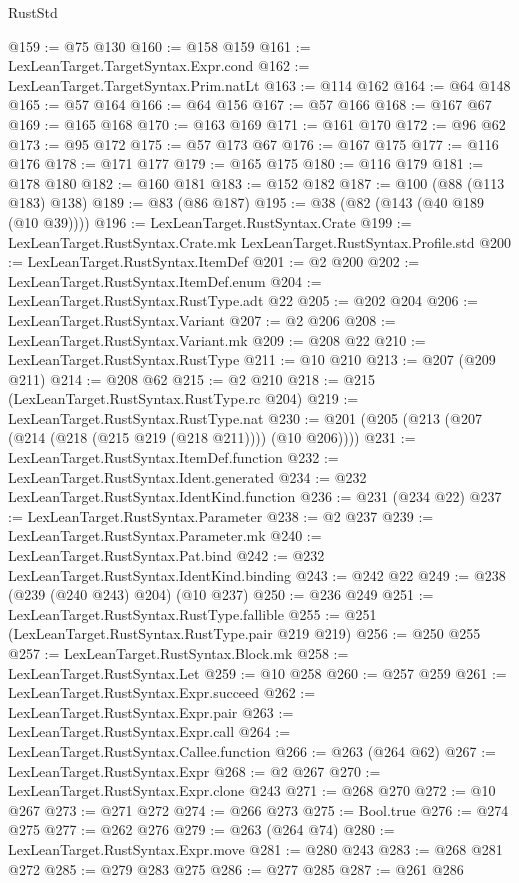 \begin{lexlean}{RustStd}
\begin{coremodule}
{\begin{coremodule}
{{{{{{{@159 := @75 @130
@160 := @158 @159
@161 := LexLeanTarget.TargetSyntax.Expr.cond
@162 := LexLeanTarget.TargetSyntax.Prim.natLt
@163 := @114 @162
@164 := @64 @148
@165 := @57 @164
@166 := @64 @156
@167 := @57 @166
@168 := @167 @67
@169 := @165 @168
@170 := @163 @169
@171 := @161 @170
@172 := @96 @62
@173 := @95 @172
@175 := @57 @173 @67
@176 := @167 @175
@177 := @116 @176
@178 := @171 @177
@179 := @165 @175
@180 := @116 @179
@181 := @178 @180
@182 := @160 @181
@183 := @152 @182
@187 := @100 (@88 (@113 @183) @138)
@189 := @83 (@86 @187)
@195 := @38 (@82 (@143 (@40 @189 (@10 @39))))
@196 := LexLeanTarget.RustSyntax.Crate
@199 := LexLeanTarget.RustSyntax.Crate.mk LexLeanTarget.RustSyntax.Profile.std
@200 := LexLeanTarget.RustSyntax.ItemDef
@201 := @2 @200
@202 := LexLeanTarget.RustSyntax.ItemDef.enum
@204 := LexLeanTarget.RustSyntax.RustType.adt @22
@205 := @202 @204
@206 := LexLeanTarget.RustSyntax.Variant
@207 := @2 @206
@208 := LexLeanTarget.RustSyntax.Variant.mk
@209 := @208 @22
@210 := LexLeanTarget.RustSyntax.RustType
@211 := @10 @210
@213 := @207 (@209 @211)
@214 := @208 @62
@215 := @2 @210
@218 := @215 (LexLeanTarget.RustSyntax.RustType.rc @204)
@219 := LexLeanTarget.RustSyntax.RustType.nat
@230 := @201 (@205 (@213 (@207 (@214 (@218 (@215 @219 (@218 @211)))) (@10 @206))))
@231 := LexLeanTarget.RustSyntax.ItemDef.function
@232 := LexLeanTarget.RustSyntax.Ident.generated
@234 := @232 LexLeanTarget.RustSyntax.IdentKind.function
@236 := @231 (@234 @22)
@237 := LexLeanTarget.RustSyntax.Parameter
@238 := @2 @237
@239 := LexLeanTarget.RustSyntax.Parameter.mk
@240 := LexLeanTarget.RustSyntax.Pat.bind
@242 := @232 LexLeanTarget.RustSyntax.IdentKind.binding
@243 := @242 @22
@249 := @238 (@239 (@240 @243) @204) (@10 @237)
@250 := @236 @249
@251 := LexLeanTarget.RustSyntax.RustType.fallible
@255 := @251 (LexLeanTarget.RustSyntax.RustType.pair @219 @219)
@256 := @250 @255
@257 := LexLeanTarget.RustSyntax.Block.mk
@258 := LexLeanTarget.RustSyntax.Let
@259 := @10 @258
@260 := @257 @259
@261 := LexLeanTarget.RustSyntax.Expr.succeed
@262 := LexLeanTarget.RustSyntax.Expr.pair
@263 := LexLeanTarget.RustSyntax.Expr.call
@264 := LexLeanTarget.RustSyntax.Callee.function
@266 := @263 (@264 @62)
@267 := LexLeanTarget.RustSyntax.Expr
@268 := @2 @267
@270 := LexLeanTarget.RustSyntax.Expr.clone @243
@271 := @268 @270
@272 := @10 @267
@273 := @271 @272
@274 := @266 @273
@275 := Bool.true
@276 := @274 @275
@277 := @262 @276
@279 := @263 (@264 @74)
@280 := LexLeanTarget.RustSyntax.Expr.move
@281 := @280 @243
@283 := @268 @281 @272
@285 := @279 @283 @275
@286 := @277 @285
@287 := @261 @286
}}}}}}}
\end{coremodule}}
\end{coremodule}
\end{lexlean}
